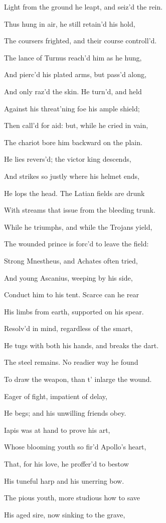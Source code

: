 Light from the ground he leapt, and seiz’d the rein.

Thus hung in air, he still retain’d his hold,

The coursers frighted, and their course controll’d.

The lance of Turnus reach’d him as he hung,

And pierc’d his plated arms, but pass’d along,

And only raz’d the skin. He turn’d, and held

Against his threat’ning foe his ample shield;

Then call’d for aid: but, while he cried in vain,

The chariot bore him backward on the plain.

He lies revers’d; the victor king descends,

And strikes so justly where his helmet ends,

He lops the head. The Latian fields are drunk

With streams that issue from the bleeding trunk.

While he triumphs, and while the Trojans yield,

The wounded prince is forc’d to leave the field:

Strong Mnestheus, and Achates often tried,

And young Ascanius, weeping by his side,

Conduct him to his tent. Scarce can he rear

His limbs from earth, supported on his spear.

Resolv’d in mind, regardless of the smart,

He tugs with both his hands, and breaks the dart.

The steel remains. No readier way he found

To draw the weapon, than t’ inlarge the wound.

Eager of fight, impatient of delay,

He begs; and his unwilling friends obey.

Iapis was at hand to prove his art,

Whose blooming youth so fir’d Apollo’s heart,

That, for his love, he proffer’d to bestow

His tuneful harp and his unerring bow.

The pious youth, more studious how to save

His aged sire, now sinking to the grave,

